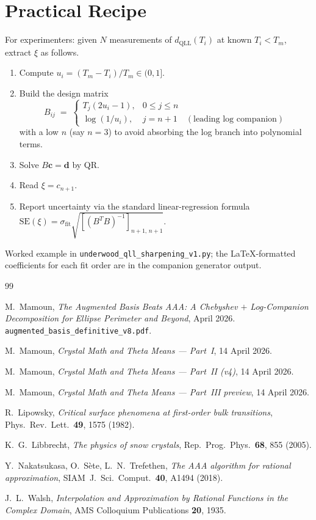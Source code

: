 \documentclass[11pt,letterpaper]{article}
\theoremstyle{plain}
\theoremstyle{definition}
\begin{document}
\section{Practical Recipe}

For experimenters: given $N$ measurements of $d_{\text{QLL}}(T_i)$
at known $T_i < T_m$, extract $\xi$ as follows.

\begin{enumerate}[leftmargin=2em]
\item Compute $u_i = (T_m - T_i)/T_m \in (0, 1]$.
\item Build the design matrix
\[
  B_{ij} \;=\;
  \begin{cases}
    T_{j}(2 u_i - 1), & 0 \le j \le n \\
    \log(1/u_i),      & j = n+1 \quad (\text{leading log companion})
  \end{cases}
\]
with a low $n$ (say $n=3$) to avoid absorbing the log branch into
polynomial terms.
\item Solve $B \mathbf{c} = \mathbf{d}$ by QR.
\item Read $\xi = c_{n+1}$.
\item Report uncertainty via the standard linear-regression formula
$\mathrm{SE}(\xi) = \sigma_{\mathrm{fit}} \sqrt{[(B^T B)^{-1}]_{n+1,\,n+1}}$.
\end{enumerate}

Worked example in \texttt{underwood\_qll\_sharpening\_v1.py}; the
LaTeX-formatted coefficients for each fit order are in the companion
generator output.

\begin{thebibliography}{99}

 M.~Mamoun,
\emph{The Augmented Basis Beats AAA: A Chebyshev $+$ Log-Companion
Decomposition for Ellipse Perimeter and Beyond}, April 2026.
\texttt{augmented\_basis\_definitive\_v8.pdf}.

 M.~Mamoun,
\emph{Crystal Math and Theta Means — Part~I}, 14 April 2026.

 M.~Mamoun,
\emph{Crystal Math and Theta Means — Part~II (v4)}, 14 April 2026.

 M.~Mamoun,
\emph{Crystal Math and Theta Means — Part~III preview}, 14 April 2026.

 R.~Lipowsky, \emph{Critical surface phenomena at
first-order bulk transitions}, Phys.~Rev.~Lett.\ {\bf 49}, 1575 (1982).

 K.~G.~Libbrecht, \emph{The physics of snow
crystals}, Rep.~Prog.~Phys.\ {\bf 68}, 855 (2005).

 Y.~Nakatsukasa, O.~S\`ete, L.~N.~Trefethen, \emph{The
AAA algorithm for rational approximation},
SIAM~J.~Sci.~Comput.\ {\bf 40}, A1494 (2018).

 J.~L.~Walsh, \emph{Interpolation and
Approximation by Rational Functions in the Complex Domain},
AMS Colloquium Publications {\bf 20}, 1935.

\end{thebibliography}
\end{document}
